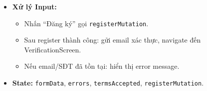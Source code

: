 \begin{itemize}
\begin{itemize}
            \item Password min 8 ký tự, có chữ hoa, số.
            \item Confirm password khớp với password.
            \item Terms phải được check.
            \item Hiển thị error realtime dưới mỗi field.
        \end{itemize}
    \item \textbf{Xử lý Input:}
        \begin{itemize}
            \item Nhấn ``Đăng ký'' gọi \texttt{registerMutation}.
            \item Sau register thành công: gửi email xác thực, navigate đến VerificationScreen.
            \item Nếu email/SĐT đã tồn tại: hiển thị error message.
        \end{itemize}
    \item \textbf{State:} \texttt{formData}, \texttt{errors}, \texttt{termsAccepted}, \texttt{registerMutation}.
\end{itemize}


